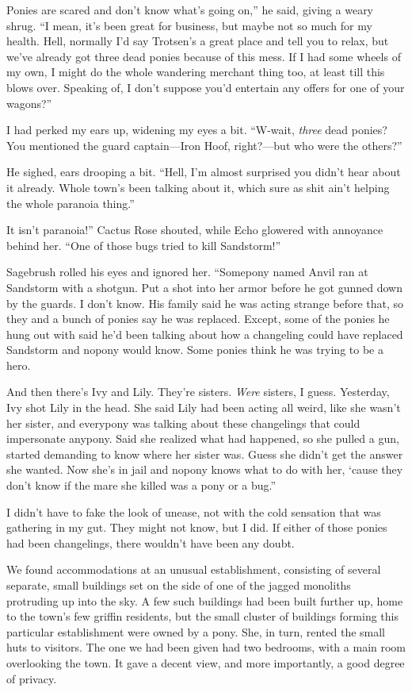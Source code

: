 \leavevmode{}Ponies are scared and don’t know what’s going on,” he said, giving a weary shrug. “I mean, it’s been great for business, but maybe not so much for my health. Hell, normally I’d say Trotsen’s a great place and tell you to relax, but we’ve already got three dead ponies because of this mess. If I had some wheels of my own, I might do the whole wandering merchant thing too, at least till this blows over. Speaking of, I don’t suppose you’d entertain any offers for one of your wagons?”

I had perked my ears up, widening my eyes a bit. “W-wait, \textit{three} dead ponies? You mentioned the guard captain—Iron Hoof, right?—but who were the others?”

He sighed, ears drooping a bit. “Hell, I’m almost surprised you didn’t hear about it already. Whole town’s been talking about it, which sure as shit ain’t helping the whole paranoia thing.”

\leavevmode{}It isn’t paranoia!” Cactus Rose shouted, while Echo glowered with annoyance behind her. “One of those bugs tried to kill Sandstorm!”

Sagebrush rolled his eyes and ignored her. “Somepony named Anvil ran at Sandstorm with a shotgun. Put a shot into her armor before he got gunned down by the guards. I don’t know. His family said he was acting strange before that, so they and a bunch of ponies say he was replaced. Except, some of the ponies he hung out with said he’d been talking about how a changeling could have replaced Sandstorm and nopony would know. Some ponies think he was trying to be a hero.

\leavevmode{}And then there’s Ivy and Lily. They’re sisters. \textit{Were} sisters, I guess. Yesterday, Ivy shot Lily in the head. She said Lily had been acting all weird, like she wasn’t her sister, and everypony was talking about these changelings that could impersonate anypony. Said she realized what had happened, so she pulled a gun, started demanding to know where her sister was. Guess she didn’t get the answer she wanted. Now she’s in jail and nopony knows what to do with her, ‘cause they don’t know if the mare she killed was a pony or a bug.”

I didn’t have to fake the look of unease, not with the cold sensation that was gathering in my gut. They might not know, but I did. If either of those ponies had been changelings, there wouldn’t have been any doubt.

{\br}%
We found accommodations at an unusual establishment, consisting of several separate, small buildings set on the side of one of the jagged monoliths protruding up into the sky. A few such buildings had been built further up, home to the town’s few griffin residents, but the small cluster of buildings forming this particular establishment were owned by a pony. She, in turn, rented the small huts to visitors. The one we had been given had two bedrooms, with a main room overlooking the town. It gave a decent view, and more importantly, a good degree of privacy.

